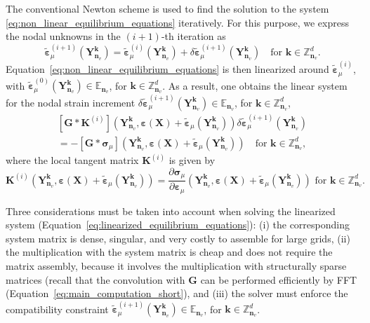 The conventional Newton scheme is used to find the solution to the system \eqref{eq:non_linear_equilibrium_equations} iteratively. For this purpose, we express the nodal unknowns in the \((i+1)\)-th iteration as
\begin{equation}
\tilde{\bm\varepsilon}_{\mu}^{(i+1)}\left(\bm{Y}_{\bm n_v}^{\bm  k}\right) =\tilde{\bm\varepsilon}_{\mu}^{(i)}\left(\bm{Y}_{\bm n_v}^{\bm  k}\right)+\delta \tilde{\bm\varepsilon}_{\mu}^{(i+1)}\left(\bm{Y}_{\bm n_v}^{\bm  k}\right)\quad \text{for \(\bm k \in \mathbb Z^d_{\bm n_v}\)}.
\end{equation}
Equation~\eqref{eq:non_linear_equilibrium_equations} is then linearized around \(\tilde{\bm\varepsilon}_\mu^{(i)}\), with \(\tilde{\bm\varepsilon}_\mu^{(0)}\left(\bm{Y}_{\bm n_v}^{\bm  k}\right) \in \mathbb{E}_{\bm n_v}\), for \(\bm k\in \mathbb Z^{d}_{\bm n_v}\).
As a result, one obtains the linear system for the nodal strain increment \(\delta \tilde{\bm\varepsilon}_\mu^{(i+1)}\left(\bm{Y}_{\bm n_v}^{\bm  k}\right) \in \mathbb{E}_{\bm n_v}\), for \(\bm k\in \mathbb Z^{d}_{\bm n_v}\),
\begin{multline} \label{eq:linearized_equilibrium_equations}
[\bm G * \bm K^{(i)}]\left(\bm{Y}_{\bm n_v}^{\bm  k}, \bm \varepsilon(\bm X)+\tilde{\bm \varepsilon}_\mu \left(\bm Y_{\bm n_v}^{\bm  k}\right)\right)\delta \tilde{\bm\varepsilon}_{\mu}^{(i+1)}\left(\bm{Y}_{\bm n_v}^{\bm  k}\right)\\ = -[\bm G * \bm\sigma_\mu]\left(\bm{Y}_{\bm n_v}^{\bm  k}, \bm \varepsilon(\bm X)+\tilde{\bm \varepsilon}_\mu \left(\bm Y_{\bm n_v}^{\bm  k}\right)\right)\quad \text{for \(\bm k \in \mathbb Z^d_{\bm n_v}\)},
\end{multline}
where the local tangent matrix \(\bm K^{(i)}\) is given by
\begin{equation}
\bm K^{(i)}\left(\bm{Y}_{\bm n_v}^{\bm  k}, \bm \varepsilon(\bm X)+\tilde{\bm \varepsilon}_\mu \left(\bm Y_{\bm n_v}^{\bm  k}\right)\right)=\frac{\partial \bm{\sigma}_\mu}{\partial \bm \varepsilon_\mu}\left(\bm{Y}_{\bm n_v}^{\bm  k}, \bm \varepsilon(\bm X)+\tilde{\bm \varepsilon}_\mu \left(\bm Y_{\bm n_v}^{\bm  k}\right)\right) \text { for } \bm  k \in \mathbb{Z}_{\bm n_v}^{d}.
\end{equation}

Three considerations must be taken into account when solving the linearized system (Equation~\eqref{eq:linearized_equilibrium_equations}):
(i) the corresponding system matrix is dense, singular, and very costly to assemble for large grids,
(ii) the multiplication with the system matrix is cheap and does not require the matrix assembly, because it involves the multiplication with structurally sparse matrices (recall that the convolution with \(\bm G\) can be performed efficiently by FFT (Equation~\eqref{eq:main_computation_short}), and
(iii) the solver must enforce the compatibility constraint \(\tilde{\bm \varepsilon}_\mu^{(i+1)}\left(\bm{Y}_{\bm n_v}^{\bm  k}\right) \in \mathbb{E}_{\bm n_v}\), for \(\bm k\in \mathbb Z^{d}_{\bm n_v}\).

